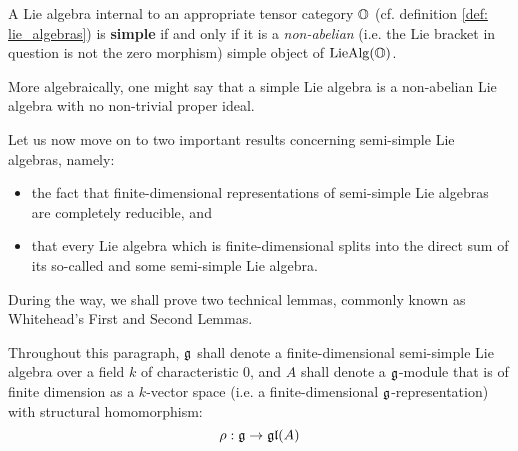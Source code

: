             \begin{definition} \label{def: simple_lie_algebras}
                A Lie algebra internal to an appropriate tensor category $\mathbb{O}$ (cf. definition \ref{def: lie_algebras}) is \textbf{simple} if and only if it is a \textit{non-abelian} (i.e. the Lie bracket in question is not the zero morphism) simple object of $\mathrm{Lie}\mathrm{Alg}(\mathbb{O})$.
                
                More algebraically, one might say that a simple Lie algebra is a non-abelian Lie algebra with no non-trivial proper ideal.
            \end{definition}
        
            Let us now move on to two important results concerning semi-simple Lie algebras, namely:
                \begin{itemize}
                    \item the fact that finite-dimensional representations of semi-simple Lie algebras are completely reducible, and
                    \item that every Lie algebra which is finite-dimensional splits into the direct sum of its so-called  and some semi-simple Lie algebra. 
                \end{itemize}
            During the way, we shall prove two technical lemmas, commonly known as Whitehead's First and Second Lemmas.
            
            \begin{convention} \label{conv: cohomology_of_semi_simple_lie_algebras_conventions}
                Throughout this paragraph, $\mathfrak{g}$ shall denote a finite-dimensional semi-simple Lie algebra over a field $k$ of characteristic $0$, and $A$ shall denote a $\mathfrak{g}$-module that is of finite dimension as a $k$-vector space (i.e. a finite-dimensional $\mathfrak{g}$-representation) with structural homomorphism:
                    $$\rho: \mathfrak{g} \to \mathfrak{gl}(A)$$
            \end{convention}
            
